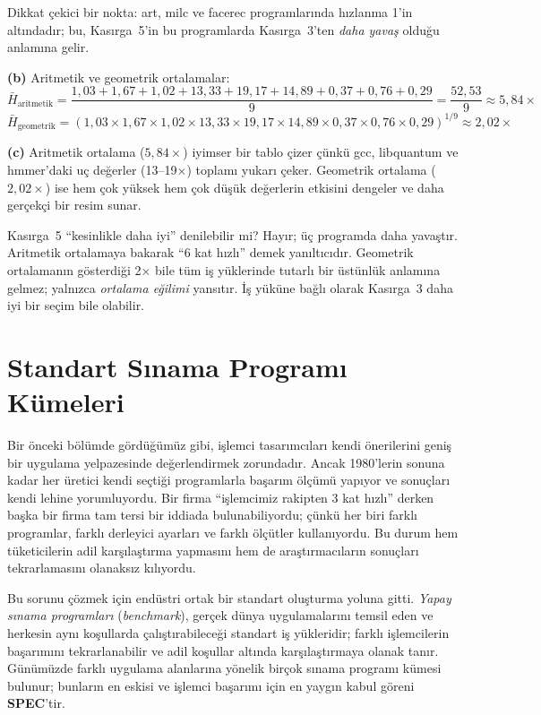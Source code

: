 \begin{ornek}[2.8]
Dikkat çekici bir nokta: art, milc ve facerec programlarında hızlanma 1'in altındadır; bu, Kasırga~5'in bu programlarda Kasırga~3'ten \emph{daha yavaş} olduğu anlamına gelir.

\textbf{(b)} Aritmetik ve geometrik ortalamalar:
\[
\bar{H}_{\text{aritmetik}} = \frac{1{,}03 + 1{,}67 + 1{,}02 + 13{,}33 + 19{,}17 + 14{,}89 + 0{,}37 + 0{,}76 + 0{,}29}{9} = \frac{52{,}53}{9} \approx 5{,}84\times
\]
\[
\bar{H}_{\text{geometrik}} = (1{,}03 \times 1{,}67 \times 1{,}02 \times 13{,}33 \times 19{,}17 \times 14{,}89 \times 0{,}37 \times 0{,}76 \times 0{,}29)^{1/9} \approx 2{,}02\times
\]

\textbf{(c)} Aritmetik ortalama ($5{,}84\times$) iyimser bir tablo çizer çünkü gcc, libquantum ve hmmer'daki uç değerler (13--19$\times$) toplamı yukarı çeker. Geometrik ortalama ($2{,}02\times$) ise hem çok yüksek hem çok düşük değerlerin etkisini dengeler ve daha gerçekçi bir resim sunar.

Kasırga~5 ``kesinlikle daha iyi'' denilebilir mi? Hayır; üç programda daha yavaştır. Aritmetik ortalamaya bakarak ``6 kat hızlı'' demek yanıltıcıdır. Geometrik ortalamanın gösterdiği 2$\times$ bile tüm iş yüklerinde tutarlı bir üstünlük anlamına gelmez; yalnızca \emph{ortalama eğilimi} yansıtır. İş yüküne bağlı olarak Kasırga~3 daha iyi bir seçim bile olabilir.
\end{ornek}



\section{Standart Sınama Programı Kümeleri}
\label{sec:yapay-sinama}

Bir önceki bölümde gördüğümüz gibi, işlemci tasarımcıları kendi önerilerini geniş bir uygulama yelpazesinde değerlendirmek zorundadır. Ancak 1980'lerin sonuna kadar her üretici kendi seçtiği programlarla başarım ölçümü yapıyor ve sonuçları kendi lehine yorumluyordu. Bir firma ``işlemcimiz rakipten 3 kat hızlı'' derken başka bir firma tam tersi bir iddiada bulunabiliyordu; çünkü her biri farklı programlar, farklı derleyici ayarları ve farklı ölçütler kullanıyordu. Bu durum hem tüketicilerin adil karşılaştırma yapmasını hem de araştırmacıların sonuçları tekrarlamasını olanaksız kılıyordu.

Bu sorunu çözmek için endüstri ortak bir standart oluşturma yoluna gitti. \emph{Yapay sınama programları} (\emph{benchmark}), gerçek dünya uygulamalarını temsil eden ve herkesin aynı koşullarda çalıştırabileceği standart iş yükleridir; farklı işlemcilerin başarımını tekrarlanabilir ve adil koşullar altında karşılaştırmaya olanak tanır. Günümüzde farklı uygulama alanlarına yönelik birçok sınama programı kümesi bulunur; bunların en eskisi ve işlemci başarımı için en yaygın kabul göreni \textbf{SPEC}'tir.

